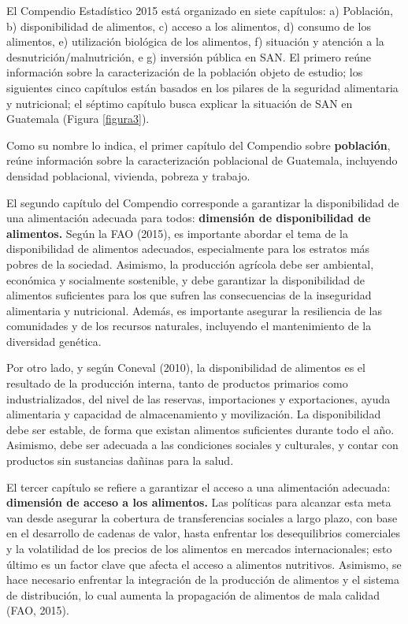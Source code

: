 
\newpage




El Compendio Estadístico 2015 está organizado en siete capítulos: a) Población, b) disponibilidad de alimentos, c) acceso a los alimentos, d) consumo de los alimentos, e) utilización biológica de los alimentos, f) situación y atención a la desnutrición/malnutrición, e g) inversión pública en SAN. El primero reúne información sobre la caracterización de la población objeto de estudio; los siguientes cinco  capítulos están basados en los pilares de la seguridad alimentaria y nutricional; el séptimo capítulo busca explicar la situación de SAN en Guatemala (Figura \ref{figura3}). 

Como su nombre lo indica, el primer capítulo del Compendio sobre \textbf{población}, reúne información sobre la caracterización poblacional de Guatemala, incluyendo densidad poblacional, vivienda, pobreza y trabajo. 

El segundo capítulo del Compendio corresponde a garantizar la disponibilidad de una alimentación adecuada para todos: \textbf{dimensión de disponibilidad de alimentos. }Según la FAO (2015), es importante abordar el tema de la disponibilidad de alimentos adecuados, especialmente para los estratos más pobres de la sociedad. Asimismo, la producción agrícola debe ser ambiental, económica y socialmente sostenible, y debe garantizar la disponibilidad de alimentos suficientes para los que sufren las consecuencias de la inseguridad alimentaria y nutricional. Además, es importante asegurar la resiliencia de las comunidades y de los recursos naturales, incluyendo el mantenimiento de la diversidad genética.

Por otro lado, y según Coneval (2010), la disponibilidad de alimentos es el resultado de la producción interna, tanto de productos primarios como industrializados, del nivel de las reservas, importaciones y exportaciones, ayuda alimentaria y capacidad de almacenamiento y movilización. La disponibilidad debe ser estable, de forma que existan alimentos suficientes durante todo el año. Asimismo, debe ser adecuada a las condiciones sociales y culturales, y contar con productos sin sustancias dañinas para la salud.

El tercer capítulo se refiere a garantizar el acceso a una alimentación adecuada: \textbf{dimensión de acceso a los alimentos.} Las políticas para alcanzar esta meta van desde asegurar la cobertura de transferencias sociales a largo plazo, con base en el desarrollo de cadenas de valor, hasta enfrentar los desequilibrios comerciales y la volatilidad de los precios de los alimentos en mercados internacionales; esto último es un factor clave que afecta el acceso a alimentos nutritivos. Asimismo, se hace necesario enfrentar la integración de la producción de alimentos y el sistema de distribución, lo cual aumenta la propagación de alimentos de mala calidad (FAO, 2015).

